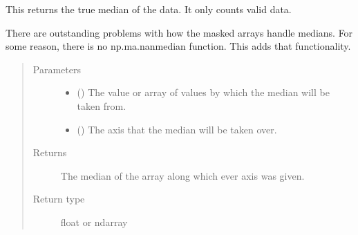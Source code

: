 \documentclass[letterpaper,10pt,english]{sphinxmanual}
\begin{document}
\begin{fulllineitems}
\label{\detokenize{python_docstrings/IfA_Smeargle.meta.mathematics:IfA_Smeargle.meta.mathematics.smeargle_median}}
This returns the true median of the data. It only counts valid data.

There are outstanding problems with how the masked arrays handle medians.
For some reason, there is no np.ma.nanmedian function. This adds that
functionality.
\begin{quote}\begin{description}
\item[{Parameters}] \leavevmode\begin{itemize}
\item {} 
 () \textendash{} The value or array of values by which the median will be taken from.

\item {} 
 () \textendash{} The axis that the median will be taken over.

\end{itemize}

\item[{Returns}] \leavevmode
{} \textendash{} The median of the array along which ever axis was given.

\item[{Return type}] \leavevmode
float or ndarray

\end{description}\end{quote}

\end{fulllineitems}

\end{document}
